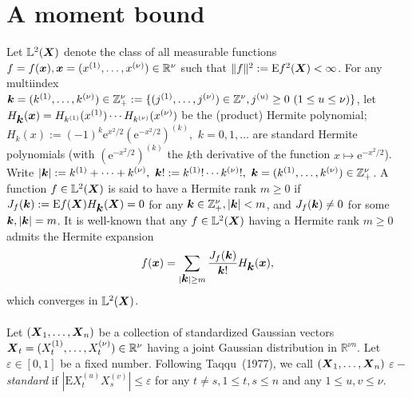\documentclass[10pt]{article}
\def\L{\mathbb{L}}
\def\R{\mathbb{R}}
\def\Z{\mathbb{Z}}
\def\e{\mathrm e}
\def\E{\mathrm E}
\newcommand{\mbf}[1]{\mbox{\boldmath $#1$}}
\begin{document}
\section{A moment bound} \label{moment}

Let $\L^2 ({\mbf X}) $ denote the class of all
measurable functions $f = f({\mbf x}), {\mbf x} = (x^{(1)}, \dots,
x^{(\nu)}) \in {\R}^\nu$ such that $\|f\|^2 := \E f^2({\mbf X}) <
\infty $. For any multiindex ${\mbf k} = (k^{(1)}, \dots,
k^{(\nu)}) \in {\Z}^\nu_+ := \{(j^{(1)}, \dots, j^{(\nu)}) \in
{\Z}^\nu, j^{(u)} \ge 0 \ (1\le u \le \nu)\}$, let $H_{\mbf
k}({\mbf x}) = H_{k^{(1)}}(x^{(1)}) \cdots H_{k^{(\nu)}}(x^{(\nu)})$
be the (product) Hermite polynomial; $H_k(x) := (-1)^k
{\e}^{x^2/2}({\e}^{-x^2/2})^{(k)},$ $k=0,1, \ldots $ are standard
Hermite polynomials (with $({\e}^{-x^2/2})^{(k)}$ the $k$th derivative of the
function $x\mapsto {\e}^{-x^2/2}$).  Write  $|{\mbf k}| := k^{(1)}+ \dots +
k^{(\nu)},  \  {\mbf k}! := k^{(1)}! \cdots k^{(\nu)}!, \ {\mbf k} =
(k^{(1)}, \dots, k^{(\nu)}) \in {\Z}^\nu_+$. A function $f\in
\L^2({\mbf X})$ is said to have a Hermite rank $m\ge 0$ if $J_f
({\mbf k}) := \E f({\mbf X}) H_{\mbf k}({\mbf X}) =0 $  for any
${\mbf k}\in {\Z}_+^\nu, |{\mbf k}| < m$, and $J_f ({\mbf k}) \ne
0$ for some  ${\mbf k}, |{\mbf k}| = m$. It is well-known that any
$f \in \L^2({\mbf X}) $ having a Hermite rank $m\ge 0$ admits the
Hermite expansion
\begin{equation}\label{hermite0}
f({\mbf x}) = \sum_{|{\mbf k}|\ge m} \frac{J_f({\mbf k})}{{\mbf
k}!} H_{\mbf k}({\mbf x}),
\end{equation}
which converges in $\L^2 ({\mbf X}) $.\\
~\\
Let $({\mbf X}_1, \dots, {\mbf X}_n)$ be a collection of
standardized Gaussian vectors ${\mbf X}_t = (X^{(1)}_{t}, \dots,
X^{(\nu)}_{t}) \in {\R}^\nu $ having a joint Gaussian distribution
in ${\R}^{\nu n}$. Let $\varepsilon \in [0,1]$ be a fixed number.
Following Taqqu~(1977), we call $({\mbf X}_1, \dots, {\mbf X}_n)$
{\it $\varepsilon-$standard} if $|\E X^{(u)}_{t} X^{(v)}_{s}| \le
\varepsilon $ for any $t \neq s, 1\le t,s\le n$ and any $1\le u, v
\le \nu$.




\bigskip
\end{document}
